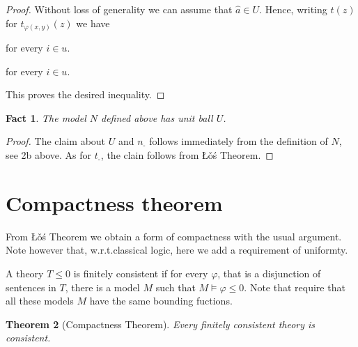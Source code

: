 \documentclass[12pt,letterpaper,oneside,reqno]{amsart}
\theoremstyle{plain}
\newtheorem{theorem}{Theorem}%
\newtheorem{fact}[theorem]{Fact}
\theoremstyle{remark}
\begin{document}
\begin{proof}
Without loss of generality we can assume that $\hat a\in U$. 
Hence, writing $t(z)$ for $t_{\varphi(x,y)}(z)$ we have

\quad for every $i\in u$.

\quad for every $i\in u$.



This proves the desired inequality.
\end{proof}


\begin{fact}
  The model $N$ defined above has unit ball $U$.
\end{fact}

\begin{proof}
  The claim about $U$ and $n_{\mbox{-}}$ follows immediately from the definition of $N$, see 2b above.
  As for $t_{\mbox{-}}$, the clain follows from \L\v{o}\'s Theorem.
\end{proof}


\section{Compactness theorem}\label{compactness}

\def\ceq#1#2#3{\parbox[t]{20ex}{$\displaystyle #1$}\parbox{5ex}{\hfil $#2$}{$\displaystyle #3$}}

From \L\v{o}\'s Theorem we obtain a form of compactness with the usual argument.
Note however that, w.r.t.\@ classical logic, here we add a requirement of uniformty.

A theory $T\le0$ is finitely consistent if for every $\varphi$, that is a disjunction of sentences in $T$, there is a model $M$ such that $M\models \varphi\le0$.
Note that require that all these models $M$ have the same bounding fuctions.

\begin{theorem}[Compactness Theorem]\label{thm_compattezza}
  Every finitely consistent theory is consistent. 
  \end{theorem}
  
\end{document}
